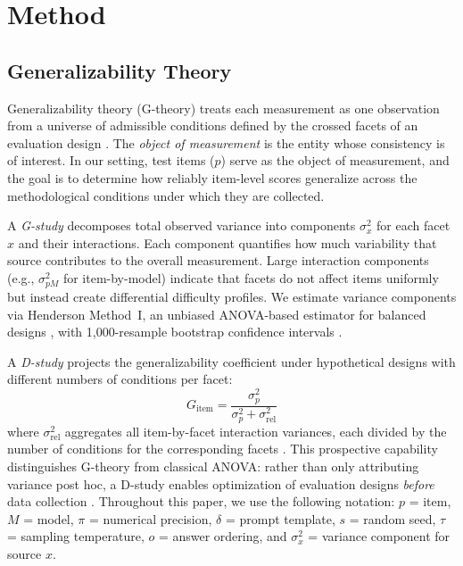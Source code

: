 \section{Method}
\label{sec:method}

\subsection{Generalizability Theory}
\label{sec:gtheory}

Generalizability theory (G-theory) treats each measurement as one observation from a universe of admissible conditions defined by the crossed facets of an evaluation design \cite{shavelson1991generalizability, brennan2001generalizability}. The \emph{object of measurement} is the entity whose consistency is of interest. In our setting, test items ($p$) serve as the object of measurement, and the goal is to determine how reliably item-level scores generalize across the methodological conditions under which they are collected.

A \emph{G-study} decomposes total observed variance into components $\sigma^2_x$ for each facet $x$ and their interactions. Each component quantifies how much variability that source contributes to the overall measurement. Large interaction components (e.g., $\sigma^2_{pM}$ for item-by-model) indicate that facets do not affect items uniformly but instead create differential difficulty profiles. We estimate variance components via Henderson Method~I, an unbiased ANOVA-based estimator for balanced designs \cite[Ch.~3]{brennan2001generalizability}, with 1,000-resample bootstrap confidence intervals \cite{li2023bootstrap}.

A \emph{D-study} projects the generalizability coefficient under hypothetical designs with different numbers of conditions per facet:
\begin{equation}
G_\text{item} = \frac{\sigma^2_p}{\sigma^2_p + \sigma^2_\text{rel}}
\label{eq:gcoeff}
\end{equation}
where $\sigma^2_\text{rel}$ aggregates all item-by-facet interaction variances, each divided by the number of conditions for the corresponding facets \cite[Ch.~4]{brennan2001generalizability}. This prospective capability distinguishes G-theory from classical ANOVA: rather than only attributing variance post hoc, a D-study enables optimization of evaluation designs \emph{before} data collection \cite{shavelson1989gtheory}. Throughout this paper, we use the following notation: $p$ = item, $M$ = model, $\pi$ = numerical precision, $\delta$ = prompt template, $s$ = random seed, $\tau$ = sampling temperature, $o$ = answer ordering, and $\sigma^2_x$ = variance component for source $x$.

